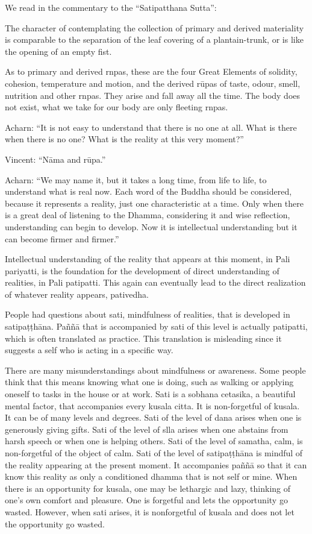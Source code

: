 We read in the commentary to the ``Satipatthana Sutta'': 

The character of contemplating the collection of primary and derived materiality is comparable to the separation of the leaf covering of a plantain-trunk, or is like the opening of an empty fist. 

As to primary and derived rnpas, these are the four Great Elements of solidity, 
cohesion, temperature and motion, and the derived rūpas of taste, odour, smell, 
nutrition and other rnpas. They arise and fall away all the time. The body does 
not exist, what we take for our body are only fleeting rnpas. 

Acharn: ``It is not easy to understand that there is no one at all. What is there 
when there is no one? What is the reality at this very moment?'' 

Vincent: ``Nāma and rūpa.'' 

Acharn: ``We may name it, but it takes a long time, from life to life, to understand what is real now. Each word of the Buddha should be considered, because 
it represents a reality, just one characteristic at a time. Only when there is a 
great deal of listening to the Dhamma, considering it and wise reflection, understanding can begin to develop. Now it is intellectual understanding but it can 
become firmer and firmer.'' 

Intellectual understanding of the reality that appears at this moment, in Pali 
pariyatti, is the foundation for the development of direct understanding of realities, in Pali patipatti. This again can eventually lead to the direct realization of 
whatever reality appears, pativedha. 

People had questions about sati, mindfulness of realities, that is developed in 
satipaṭṭhāna. Paññā that is accompanied by sati of this level is actually patipatti, 
which is often translated as practice. This translation is misleading since it suggests a self who is acting in a specific way. 

There are many misunderstandings about mindfulness or awareness. Some people think that this means knowing what one is doing, such as walking or applying oneself to tasks in the house or at work. Sati is a sobhana cetasika, a beautiful mental factor, that accompanies every kusala citta. It is non-forgetful of 
kusala. It can be of many levels and degrees. Sati of the level of dana arises 
when one is generously giving gifts. Sati of the level of slla arises when one abstains from harsh speech or when one is helping others. Sati of the level of samatha, calm, is non-forgetful of the object of calm. Sati of the level of 
satipaṭṭhāna is mindful of the reality appearing at the present moment. It accompanies paññā so that it can know this reality as only a conditioned dhamma 
that is not self or mine. When there is an opportunity for kusala, one may be lethargic and lazy, thinking of one's own comfort and pleasure. One is forgetful 
and lets the opportunity go wasted. However, when sati arises, it is nonforgetful of kusala and does not let the opportunity go wasted. 

